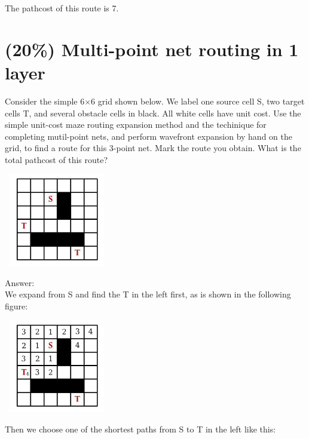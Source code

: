 \documentclass[12pt]{article}
\begin{document}
        \noindent
        The pathcost of this route is 7.

    \section{(20\%) Multi-point net routing in 1 layer}

        Consider the simple 6$\times$6 grid shown below. We label one source cell S, two
        target cells T, and several obstacle cells in black. All white cells have unit cost.
        Use the simple unit-cost maze routing expansion method and the techinique for
        completing mutil-point nets, and perform wavefront expansion by hand on the grid,
        to find a route for this 3-point net. Mark the route you obtain. What is the total
        pathcost of this route?

        \begin{center}
            \includegraphics[width = 1.80in, height = 1.60in]{figure6.png}
        \end{center}

        \noindent
        Answer:\\

        \noindent
        We expand from S and find the T in the left first, as is shown in the following
        figure:

        \begin{center}
            \includegraphics[width = 1.80in, height = 1.60in]{figure7.png}
        \end{center}

        \noindent
        Then we choose one of the shortest paths from S to T in the left like this:
\end{document}
